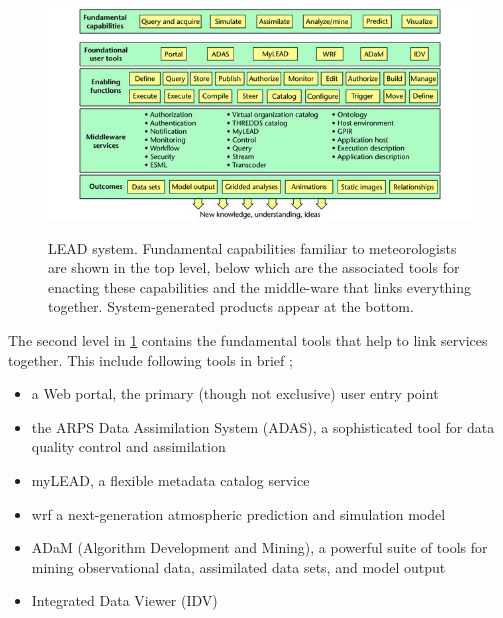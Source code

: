 \begin{figure}[htp]
    \centering
    \includegraphics[width=1.0\textwidth]{lead/LEAD-system-Fundamental-capabilities-familiar-to-meteorologists-are-shown-in-the-top_W640.jpg}\\
    \caption{LEAD system. Fundamental capabilities familiar to meteorologists are shown in the top level, below which are the associated tools for enacting these capabilities and the middle-ware that links everything together. System-generated products appear at the bottom. \cite{Droegemeier2005Service-OrientedWeather} }
    \label{fi:lead_system}
\end{figure}

The second level in \ref{fi:lead_system} contains the fundamental tools that help to link services together. This include following tools in brief \cite{Droegemeier2005Service-OrientedWeather};
\begin{itemize}
    \item a Web portal, the primary (though not exclusive) user entry point
    \item the ARPS Data Assimilation System (ADAS), a sophisticated tool for data quality control and assimilation
    \item myLEAD, a flexible metadata catalog service
    \item \acrfull{wrf} a next-generation atmospheric prediction and simulation model
    \item ADaM (Algorithm Development and Mining), a powerful suite of tools for mining observational data, assimilated data sets, and model output 
    \item Integrated Data Viewer (IDV) 
\end{itemize}

